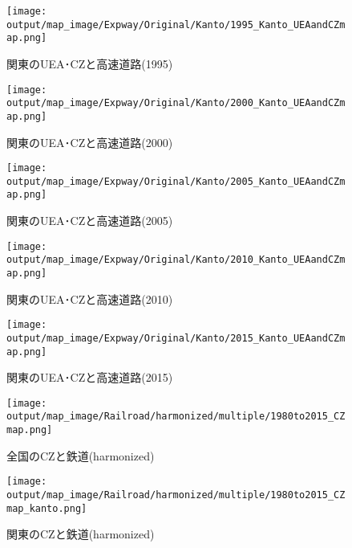 \documentclass{ltjsarticle}
\begin{document}
\begin{figure}[pbth]
  \centering
  \texttt{[image: output/map\_image/Expway/Original/Kanto/1995\_Kanto\_UEAandCZmap.png]}
  \caption{\label{1995:KanCZandUEA:Expway}関東のUEA･CZと高速道路(1995)}
\end{figure}


\begin{figure}[pbth]
  \centering
  \texttt{[image: output/map\_image/Expway/Original/Kanto/2000\_Kanto\_UEAandCZmap.png]}
  \caption{\label{2000:KanCZandUEA:Expway}関東のUEA･CZと高速道路(2000)}
\end{figure}


\begin{figure}[pbth]
  \centering
  \texttt{[image: output/map\_image/Expway/Original/Kanto/2005\_Kanto\_UEAandCZmap.png]}
  \caption{\label{2005:KanCZandUEA:Expway}関東のUEA･CZと高速道路(2005)}
\end{figure}


\begin{figure}[pbth]
  \centering
  \texttt{[image: output/map\_image/Expway/Original/Kanto/2010\_Kanto\_UEAandCZmap.png]}
  \caption{\label{2010:KanCZandUEA:Expway}関東のUEA･CZと高速道路(2010)}
\end{figure}


\begin{figure}[pbth]
  \centering
  \texttt{[image: output/map\_image/Expway/Original/Kanto/2015\_Kanto\_UEAandCZmap.png]}
  \caption{\label{2015:KanCZandUEA:Expway}関東のUEA･CZと高速道路(2015)}
\end{figure}

\clearpage

\begin{figure}[pbth]
  \centering
  \texttt{[image: output/map\_image/Railroad/harmonized/multiple/1980to2015\_CZmap.png]}
  \caption{\label{ham:allCZandRail}全国のCZと鉄道(harmonized)}
\end{figure}

\begin{figure}[pbth]
  \centering
  \texttt{[image: output/map\_image/Railroad/harmonized/multiple/1980to2015\_CZmap\_kanto.png]}
  \caption{\label{ham:KanCZandRail}関東のCZと鉄道(harmonized)}
\end{figure}
\end{document}

